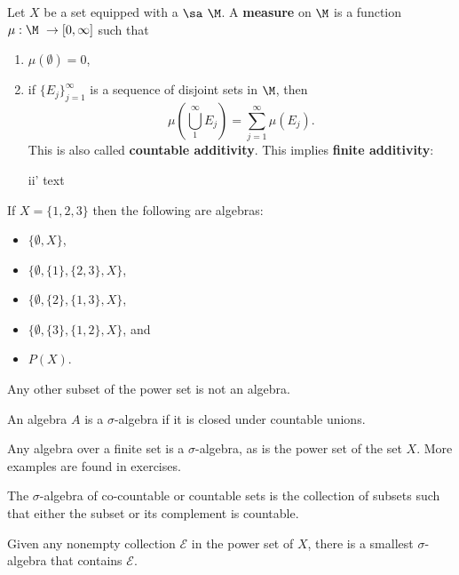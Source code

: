\begin{dfn}  Let $X$ be a set equipped with a $\sa$ $\M$. A \textbf{measure} on $\M$ is a function $\mu : \M \ \rightarrow [0,\infty]$ such that \begin{enumerate}[i]
\item $\mu(\emptyset)=0$,
\item if $\{E_j\}_{j=1}^\infty$ is a sequence of disjoint sets in $\M$, then 
\begin{equation*}
 	\mu\left( \bigcup_1^\infty E_j \right)= \sum_{j=1}^\infty \mu (E_j).
 \end{equation*}
 This is also called \textbf{countable additivity}. This implies \textbf{finite additivity}:
 \item[ii'] text 
\end{enumerate}
\end{dfn}

\begin{example} If $X = \{ 1, 2, 3 \}$ then the following are algebras:
\begin{itemize}
\item $ \{ \emptyset, X \} $,
\item $ \{ \emptyset, \{ 1 \}, \{ 2, 3 \}, X \}$,
\item $ \{ \emptyset, \{ 2 \}, \{ 1, 3 \}, X \} $,
\item $ \{ \emptyset, \{ 3 \}, \{ 1, 2 \}, X \}$, and 
\item $ P(X)$.
\end{itemize}
Any other subset of the power set is not an algebra.
\end{example}

\begin{dfn} An algebra $A$ is a $\sigma$-algebra if it is closed under countable unions. \end{dfn}

\begin{example}
Any algebra over a finite set is a $\sigma$-algebra, as is the power set of the set $X$. More examples are found in exercises.
\end{example}

\begin{dfn} The $\sigma$-algebra of co-countable or countable sets is the collection of subsets such that either the subset or its complement is countable.
\end{dfn}

\begin{prop} Given any nonempty collection $ \mathcal{E}$ in the power set of $X$, there is a smallest $\sigma$-algebra that contains $\mathcal{E}$. \end{prop}

